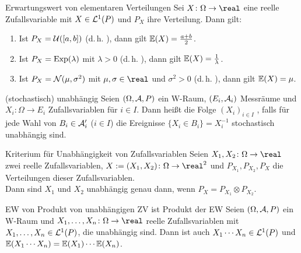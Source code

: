 \begin{Satz}{Erwartungswert von elementaren Verteilungen}
    Sei $X\colon \Omega \rightarrow \real$ eine reelle Zufallsvariable mit $X \in \mathcal{L}^1(P)$
    und $P_X$ ihre Verteilung.
    Dann gilt:
    \begin{enumerate}
        \item
        Ist $P_X = \mathcal{U}([a, b])$ (d.\,h. ),
        dann gilt $\mathbb{E}(X) = \frac{a + b}{2}$.

        \item
        Ist $P_X = \text{Exp}(\lambda)$ mit $\lambda > 0$ (d.\,h. ),
        dann gilt $\mathbb{E}(X) = \frac{1}{\lambda}$.

        \item
        Ist $P_X = \mathcal{N}(\mu, \sigma^2)$ mit $\mu, \sigma \in \real$ und $\sigma^2 > 0$
        (d.\,h. ),
        dann gilt $\mathbb{E}(X) = \mu$.
    \end{enumerate}
\end{Satz}

\linie

\begin{Def}{(stochastisch) unabhängig}
    Seien $(\Omega, \mathcal{A}, P)$ ein W-Raum, $(E_i, \mathcal{A}_i)$ Messräume und\\
    $X_i\colon \Omega \rightarrow E_i$ Zufallsvariablen für $i \in I$.
    Dann heißt die Folge $(X_i)_{i \in I}$ , falls
    für jede Wahl von $B_i \in \mathcal{A}_i'$ ($i \in I$)
    die Ereignisse $\{X_i \in B_i\} = X_i^{-1}$ stochastisch unabhängig sind.
\end{Def}

\begin{Lemma}{Kriterium für Unabhängigkeit von Zufallsvariablen}
    Seien $X_1, X_2\colon \Omega \rightarrow \real$ zwei reelle Zufallsvariablen,
    $X := (X_1, X_2)\colon \Omega \rightarrow \real^2$ und
    $P_{X_1}, P_{X_2}, P_X$ die Verteilungen dieser Zufallsvariablen.\\
    Dann sind $X_1$ und $X_2$ unabhängig genau dann, wenn $P_X = P_{X_1} \otimes P_{X_2}$.
\end{Lemma}

\begin{Satz}{EW von Produkt von unabhängigen ZV ist Produkt der EW}
    Seien $(\Omega, \mathcal{A}, P)$ ein W-Raum und $X_1, \dotsc, X_n\colon \Omega \rightarrow \real$
    reelle Zufallsvariablen mit $X_1, \dotsc, X_n \in \mathcal{L}^1(P)$, die unabhängig sind.
    Dann ist auch $X_1 \dotsm X_n \in \mathcal{L}^1(P)$ und
    $\mathbb{E}(X_1 \dotsm X_n) = \mathbb{E}(X_1) \dotsm \mathbb{E}(X_n)$.
\end{Satz}

